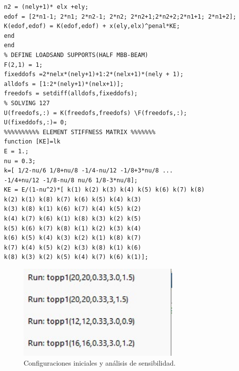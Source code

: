 \documentclass{article}
\begin{document}
\begin{lstlisting}
n2 = (nely+1)* elx +ely;
edof = [2*n1-1; 2*n1; 2*n2-1; 2*n2; 2*n2+1;2*n2+2;2*n1+1; 2*n1+2];
K(edof,edof) = K(edof,edof) + x(ely,elx)^penal*KE;
end
end
% DEFINE LOADSAND SUPPORTS(HALF MBB-BEAM)
F(2,1) = 1;
fixeddofs =2*nelx*(nely+1)+1:2*(nelx+1)*(nely + 1);
alldofs = [1:2*(nely+1)*(nelx+1)];
freedofs = setdiff(alldofs,fixeddofs);
% SOLVING 127
U(freedofs,:) = K(freedofs,freedofs) \F(freedofs,:);
U(fixeddofs,:)= 0;
%%%%%%%%%% ELEMENT STIFFNESS MATRIX %%%%%%%
function [KE]=lk
E = 1.;
nu = 0.3;
k=[ 1/2-nu/6 1/8+nu/8 -1/4-nu/12 -1/8+3*nu/8 ...
-1/4+nu/12 -1/8-nu/8 nu/6 1/8-3*nu/8];
KE = E/(1-nu^2)*[ k(1) k(2) k(3) k(4) k(5) k(6) k(7) k(8)
k(2) k(1) k(8) k(7) k(6) k(5) k(4) k(3)
k(3) k(8) k(1) k(6) k(7) k(4) k(5) k(2)
k(4) k(7) k(6) k(1) k(8) k(3) k(2) k(5)
k(5) k(6) k(7) k(8) k(1) k(2) k(3) k(4)
k(6) k(5) k(4) k(3) k(2) k(1) k(8) k(7)
k(7) k(4) k(5) k(2) k(3) k(8) k(1) k(6)
k(8) k(3) k(2) k(5) k(4) k(7) k(6) k(1)];
\end{lstlisting}
\begin{figure}[htp] %
    \centering
    \includegraphics[width=80mm]{Configuraciones.jpeg} %
    \caption{Configuraciones iniciales y análisis de sensibilidad.}
    \label{grafica}
\end{figure}
\newpage
\end{document}
